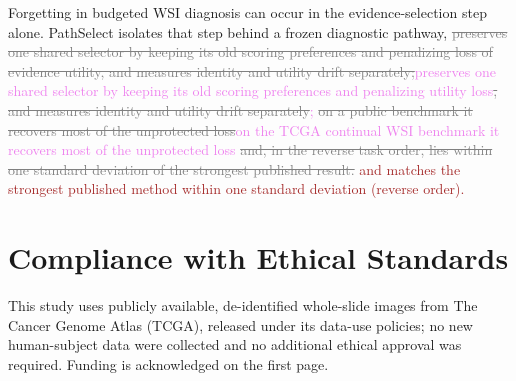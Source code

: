 \documentclass{article}
\newif\ifmarkup \markuptrue
\newcommand{\repc}[3]{\ifmarkup\textcolor{gray}{\sout{#2}}\textcolor{#1}{#3}\else#3\fi}
\newcommand{\repP}[2]{\repc{violet}{#1}{#2}}  %
\newcommand{\repB}[2]{\repc{brown}{#1}{#2}}   %
\newcommand{\delB}[1]{\ifmarkup\textcolor{gray}{\sout{#1}}\fi}
\begin{document}
Forgetting in budgeted WSI diagnosis can occur in the evidence-selection step alone. PathSelect isolates that step behind a frozen diagnostic pathway, \repP{preserves one shared selector by keeping its old scoring preferences and penalizing loss of evidence utility, and measures identity and utility drift separately;}{preserves one shared selector by keeping its old scoring preferences and penalizing utility loss\delB{, and measures identity and utility drift separately};} \repP{on a public benchmark it recovers most of the unprotected loss}{on the TCGA continual WSI benchmark it recovers most of the unprotected loss}\repB{ and, in the reverse task order, lies within one standard deviation of the strongest published result.}{ and matches the strongest published method within one standard deviation (reverse order).}




\section*{Compliance with Ethical Standards}
This study uses publicly available, de-identified whole-slide images from The Cancer Genome Atlas (TCGA), released under its data-use policies; no new human-subject data were collected and no additional ethical approval was required. Funding is acknowledged on the first page.
\end{document}
